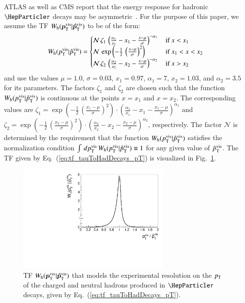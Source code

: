 ATLAS as well as CMS report that the energy response for hadronic
$\Pgt$ decays may be asymmetric~\cite{ATLAS:2011tfa,PRF-14-001}.
For the purpose of this paper, we assume the TF $W_{\textrm{h}}( \bm{p}_{\textrm{T}}^{\textrm{vis}} | \bm{\hat{p}}_{\textrm{T}}^{\textrm{vis}} )$ to be of the form:
\begin{equation}
W_{\textrm{h}}( p_{\textrm{T}}^{\textrm{vis}} | \hat{p}_{\textrm{T}}^{\textrm{vis}} ) = 
 \begin{cases}
   \mathcal{N} \, \zeta_{1} \, \left( \frac{\alpha_{1}}{x_{1}} - x_{1} - \frac{x - \mu}{\sigma} \right)^{-\alpha_{1}} \,  
 & \mbox{if } x < x_{1} \\
   \mathcal{N} \, \exp\left( -\frac{1}{2} \, \left( \frac{x - \mu}{\sigma} \right)^{2} \right) \,
 & \mbox{if } x_{1} < x < x_{2} \\
   \mathcal{N} \, \zeta_{2} \, \left( \frac{\alpha_{2}}{x_{2}} - x_{2} - \frac{x - \mu}{\sigma} \right)^{-\alpha_{2}} \,
 & \mbox{if } x > x_{2} 
 \end{cases}
\label{eq:tf_tauToHadDecays_pT}
\end{equation}
and use the values $\mu = 1.0$, $\sigma = 0.03$, $x_{1} = 0.97$, $\alpha_{1} = 7$,
$x_{2} = 1.03$, and $\alpha_{2} = 3.5$ for its parameters.
The factors $\zeta_{1}$ and $\zeta_{2}$ are chosen such that the
function $W_{\textrm{h}}( p_{\textrm{T}}^{\textrm{vis}} | \hat{p}_{\textrm{T}}^{\textrm{vis}} )$ is continuous at
the points $x = x_{1}$ and $x = x_{2}$. 
The corresponding values are 
$\zeta_{1} = \exp\left( -\frac{1}{2} \, \left( \frac{x_{1} - \mu}{\sigma} \right)^{2} \right) \cdot \left( \frac{\alpha_{1}}{x_{1}} - x_{1} - \frac{x_{1} - \mu}{\sigma} \right)^{\alpha_{1}}$
and
$\zeta_{2} = \exp\left( -\frac{1}{2} \, \left( \frac{x_{2} - \mu}{\sigma} \right)^{2} \right) \cdot \left( \frac{\alpha_{2}}{x_{2}} - x_{2} - \frac{x_{2} - \mu}{\sigma} \right)^{\alpha_{2}}$, 
respectively.
The factor $\mathcal{N}$ is determined by the requirement that the function $W_{\textrm{h}}( p_{\textrm{T}}^{\textrm{vis}} | \hat{p}_{\textrm{T}}^{\textrm{vis}} )$ 
satisfies the normalization condition $\int \, dp_{\textrm{T}}^{\textrm{vis}} \, W_{\textrm{h}}( p_{\textrm{T}}^{\textrm{vis}} | \hat{p}_{\textrm{T}}^{\textrm{vis}} ) \equiv 1$ for any given value of $\hat{p}_{\textrm{T}}^{\textrm{vis}}$.
The TF given by Eq.~(\ref{eq:tf_tauToHadDecays_pT}) is visualized in Fig.~\ref{fig:tf_tauToHadDecays_pT}.

\begin{figure}
\begin{center}
\includegraphics*[height=54mm]{figures/tf_tauToHadDecays_pT.pdf}
\end{center}
\caption{
  TF $W_{\textrm{h}}( \bm{p}_{\textrm{T}}^{\textrm{vis}} | \bm{\hat{p}}_{\textrm{T}}^{\textrm{vis}} )$ that models the experimental resolution on the $p_{\textrm{T}}$ of the charged and neutral hadrons produced in $\Pgt$ decays,
  given by Eq.~(\ref{eq:tf_tauToHadDecays_pT}).
}
\label{fig:tf_tauToHadDecays_pT}
\end{figure}

